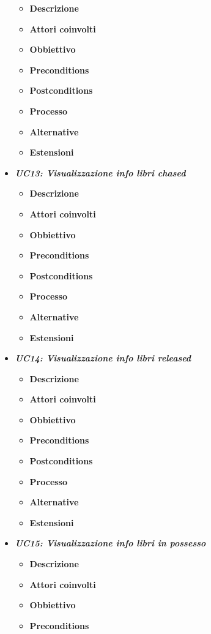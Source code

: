 \begin{itemize}
	\begin{itemize}
		\item \textbf{Descrizione}
		\item \textbf{Attori coinvolti}
		\item \textbf{Obbiettivo}
		\item \textbf{Preconditions}
		\item \textbf{Postconditions}
		\item \textbf{Processo}
		\item \textbf{Alternative}
		\item \textbf{Estensioni}
	\end{itemize}
	\item \textbf{\textit{UC13: Visualizzazione info libri chased}}
	\begin{itemize}
		\item \textbf{Descrizione}
		\item \textbf{Attori coinvolti}
		\item \textbf{Obbiettivo}
		\item \textbf{Preconditions}
		\item \textbf{Postconditions}
		\item \textbf{Processo}
		\item \textbf{Alternative}
		\item \textbf{Estensioni}
	\end{itemize}
	\item \textbf{\textit{UC14: Visualizzazione info libri released}}
	\begin{itemize}
		\item \textbf{Descrizione}
		\item \textbf{Attori coinvolti}
		\item \textbf{Obbiettivo}
		\item \textbf{Preconditions}
		\item \textbf{Postconditions}
		\item \textbf{Processo}
		\item \textbf{Alternative}
		\item \textbf{Estensioni}
	\end{itemize}
	\item \textbf{\textit{UC15: Visualizzazione info libri in possesso}}
	\begin{itemize}
		\item \textbf{Descrizione}
		\item \textbf{Attori coinvolti}
		\item \textbf{Obbiettivo}
		\item \textbf{Preconditions}

\end{itemize}
\end{itemize}
